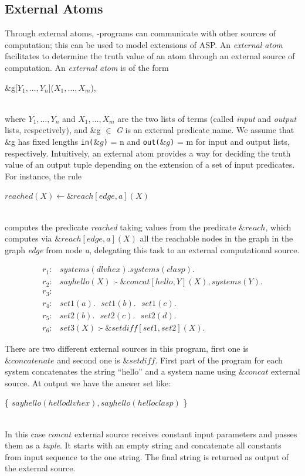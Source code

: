 \documentclass[14pt,a4paper, titlepage]{article}
\newcommand{\ext}[3]{\ensuremath{\&{#1}[#2](#3)}}
\DeclareMathOperator{\leftimpl}{:-}
\begin{document}
\subsection{External Atoms}
Through external atoms, \hex{}-programs can communicate with other sources of computation; this can be used to model extensions of ASP.  
An \emph{external atom} facilitates to determine the truth value of an atom through an external source of computation.
An \emph{external atom} is of the form \\ \centerline{ \&g[$Y_1,\dots,Y_n$]($X_1,\dots,X_m$),} \\where $Y_1,\dots,Y_n$ and $X_1,\dots,X_m$ are the two lists of terms (called \textit{input} and \textit{output} lists, respectively), and \&g $\in$ \textit{G} is an external predicate name. We assume that \&g has fixed lengths \texttt{in($\&g$)} = n and \texttt{out($\&g$)} = m for input and output lists, respectively. Intuitively, an external atom provides a way for deciding the truth value of an output tuple depending on the extension of a set of input predicates.
For instance, the rule \\ \centerline{ \textit{$reached(X) \leftarrow \&reach[edge,a](X)$}}
\\computes the predicate \textit{reached} taking values from the predicate $\&reach$, which computes via \textit{$\&reach[edge,a](X)$} all the reachable nodes in the graph in the graph \textit{edge} from node \textit{a}, delegating this task to an external computational source.
\begin{exmp}
\begin{align*}
r_1\colon& \mathit{systems}(\mathit{dlvhex}). \mathit{systems}(\mathit{clasp}). \\  
r_2\colon& \mathit{sayhello(X)} \leftimpl \ext{\mathit{concat}}{\mathit{hello, Y}}{\mathit{X}}, \mathit{systems(Y).}  \\ 
r_3\colon & \\
r_4\colon& \mathit{set1}(a). \text{ } \mathit{set1}(b). \text{ } \mathit{set1}(c).\\
r_5\colon& \mathit{set2}(b). \text{ } \mathit{set2}(c). \text{ } \mathit{set2}(d).\\
r_6\colon& \mathit{set3}(X) \leftimpl \ext{\mathit{setdiff}}{\mathit{set1, set2}}{\mathit{X}}. 
\end{align*}
\end{exmp}

There are two different external sources in this program, first one is $\mathit{\&concatenate}$ and second one is $\mathit{\&setdiff}$. First part of the program for each system concatenates the string \enquote{hello} and a system name using $\mathit{\&concat}$ external source. At output we have the answer set like:\\ 
\centerline{ \{ $\mathit{sayhello}(\mathit{hellodlvhex}), \mathit{sayhello}(\mathit{helloclasp})$ \}}
\\In this case $\mathit{concat}$ external source receives constant input parameters and passes them as a \emph{tuple}. It starts with an empty string and concatenate all constants from input sequence to the one string. The final string is returned as output of the external source.   
\end{document}
